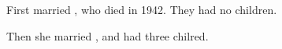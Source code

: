 
First married , who died in 1942. They had no children.

Then she married , and had three chilred.
